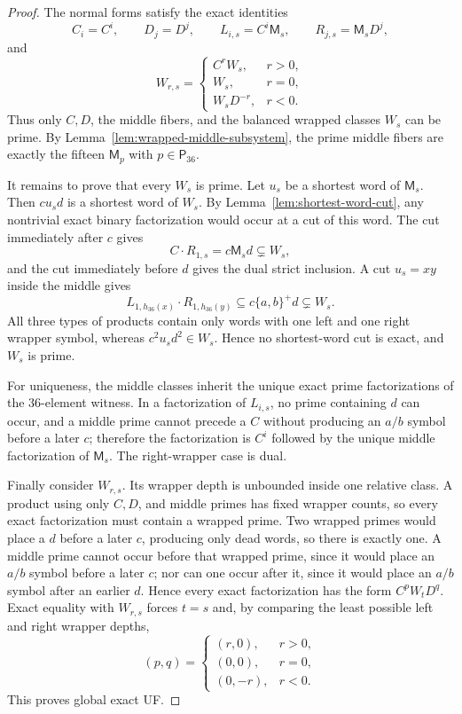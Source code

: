 \documentclass[11pt,a4paper]{article}
\begin{document}
\begin{proof}
The normal forms satisfy the exact identities
\[
  C_i=C^i,
  \qquad
  D_j=D^j,
  \qquad
  L_{i,s}=C^i\mathsf M_s,
  \qquad
  R_{j,s}=\mathsf M_sD^j,
\]
and
\[
  W_{r,s}=
  \begin{cases}
    C^rW_s,&r>0,\\
    W_s,&r=0,\\
    W_sD^{-r},&r<0.
  \end{cases}
\]
Thus only $C,D$, the middle fibers, and the balanced wrapped classes $W_s$
can be prime.  By Lemma~\ref{lem:wrapped-middle-subsystem}, the prime middle fibers are exactly the fifteen $\mathsf M_p$ with $p\in\mathsf P_{36}$.

It remains to prove that every $W_s$ is prime.  Let $u_s$ be a shortest word
of $\mathsf M_s$.  Then $cu_sd$ is a shortest word of $W_s$.  By
Lemma~\ref{lem:shortest-word-cut}, any nontrivial exact binary factorization
would occur at a cut of this word.  The cut immediately after $c$ gives
\[
  C\cdot R_{1,s}=c\mathsf M_sd\subsetneq W_s,
\]
and the cut immediately before $d$ gives the dual strict inclusion.
A cut $u_s=xy$ inside the middle gives
\[
  L_{1,h_{36}(x)}\cdot R_{1,h_{36}(y)}
  \subseteq c\{a,b\}^+d
  \subsetneq W_s.
\]
All three types of products contain only words with one left and one right
wrapper symbol, whereas $c^2u_sd^2\in W_s$.  Hence no shortest-word cut is
exact, and $W_s$ is prime.

For uniqueness, the middle classes inherit the unique exact prime
factorizations of the $36$-element witness.  In a factorization of
$L_{i,s}$, no prime containing $d$ can occur, and a middle prime cannot
precede a $C$ without producing an $a/b$ symbol before a later $c$; therefore
the factorization is $C^i$ followed by the unique middle factorization of
$\mathsf M_s$.  The right-wrapper case is dual.

Finally consider $W_{r,s}$.  Its wrapper depth is unbounded inside one
relative class.  A product using only $C,D$, and middle primes has fixed
wrapper counts, so every exact factorization must contain a wrapped prime.
Two wrapped primes would place a $d$ before a later $c$, producing only dead words, so there is exactly one.  A middle prime cannot occur before that wrapped prime, since it would place an $a/b$ symbol before a later $c$; nor can one occur after it, since it would place an $a/b$ symbol after an earlier $d$.  Hence every exact factorization has the form
\(C^pW_tD^q\).  Exact equality with $W_{r,s}$ forces $t=s$ and, by comparing
the least possible left and right wrapper depths,
\[
  (p,q)=
  \begin{cases}
    (r,0),&r>0,\\
    (0,0),&r=0,\\
    (0,-r),&r<0.
  \end{cases}
\]
This proves global exact UF.
\end{proof}
\end{document}
